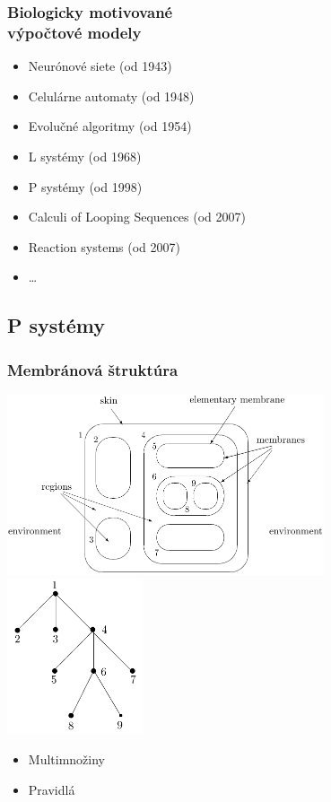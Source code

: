 \begin{frame}[t]\frametitle{Biologicky motivované \\výpočtové modely}
  \begin{itemize}
    \item Neurónové siete (od 1943)
    \item Celulárne automaty (od 1948)
    \item Evolučné algoritmy (od 1954)
    \item L systémy (od 1968)
    \item P systémy (od 1998) \cite{Paun98}
    \item Calculi of Looping Sequences (od 2007)
    \item Reaction systems (od 2007)
    \item \dots
  \end{itemize}
\end{frame}


\subsection{P systémy} %
\label{sub:p_systemy}

\begin{frame}[t]\frametitle{Membránová štruktúra}
  \includegraphics[width=0.7\textwidth]{membrane_structure.png}
  \hfill
  \includegraphics[width=0.3\textwidth]{membrane_tree.png}
  \pause
  \begin{itemize}
    \item Multimnožiny
    \pause
    \item Pravidlá
  \end{itemize}

\end{frame}


